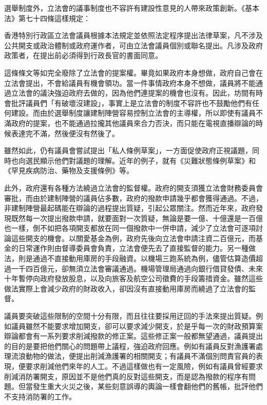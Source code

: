 選舉制度外，立法會的議事制度也不容許有建設性意見的人帶來政策創新。《基本法》第七十四條這樣規定：

\begin{displayquote}
    香港特別行政區立法會議員根據本法規定並依照法定程序提出法律草案，凡不涉及公共開支或政治體制或政府運作者，可由立法會議員個別或聯名提出。凡涉及政府政策者，在提出前必須得到行政長官的書面同意。
\end{displayquote}

這條條文等如完全廢除了立法會的提案權。畢竟如果政府本身想做，政府自己會在立法會提出，不會給議員有機會領功。當一件事情政府本身不想做，議員將不能通過立法會的議決強迫政府去做的，因為他們連提案的機會也沒有。因此，坊間有時會批評議員們「有破壞沒建設」，事實上是立法會的制度不容許也不鼓勵他們有任何建設。而由於選舉制度讓建制陣營容易控制立法會的主導權，所以即使有議員不滿政府的提案，也不能通過拉攏其他議員來合力否決，而只能在電視直播辯論的時候表達完不滿，然後便沒有然後了。

雖然如此，仍有議員會嘗試提出「私人條例草案」，一方面促使政府正視議題，同時也向選民顯示他們對議題的理解。近年的例子，就有《災難狀態條例草案》和《罕見疾病防治、藥物及支援條例》等。

此外，政府還有各種方法繞過立法會的監督權。政府的開支須獲立法會財務委員會審批，而由於建制陣營的議員佔多數，政府的撥款申請幾乎都會獲得通過。不過，非建制陣營最起碼能在辯論的過程提出質疑，引起公眾關注。然而近年來，政府發現既然每一次提出撥款申請，就要面對一次質疑，無論是要一億、十億還是一百億也一樣，倒不如把各項開支都放在同一個撥款中一併申請，減少了立法會可逐項討論這些開支的機會。以關愛基金為例，政府先後向立法會申請注資二百億元，而基金的日常運作則由督導委員會負責，立法會便先去了直接監督的能力。另一種做法，則是通過不直接動用庫房的手段融資。以機場三跑系統為例，儘管估算造價超過一千四百億元，卻無須立法會審議通過。機場管理局通過向銀行借貸發債、未來十年暫停向政府發放股息，以及向旅客及航空公司徵費的手段籌措資金。雖然這些做法實際上會減少政府的財政收入，卻因沒有直接動用庫房而繞過了立法會的監督。

議員要突破這些限制的空間十分有限，而且往往要採用迂回的手法來提出質疑。例如議員雖然不能要求增加開支，卻可以要求減少開支，於是乎每一次的財政預算案辯論都會有一系列要求削減撥款的修正案。這些修正案一般都無望通過，議員提出的目的是要把他們關心的問題帶上議程，強迫政府回應。例如有議員反對漁護署處理流浪動物的做法，便提出削減漁護署的相關開支；有議員不滿個別問責官員的表現，便要求削減他們來年的人工。不過這樣做也有一定風險，例如有議員曾經要求削減消防署開支，原因並不是他們真的反對這些開支，而是認為撥款的程序有問題。但當發生重大火災之後，某些刻意誤導的輿論一樣會翻他們的舊帳，批評他們不支持消防署的工作。

